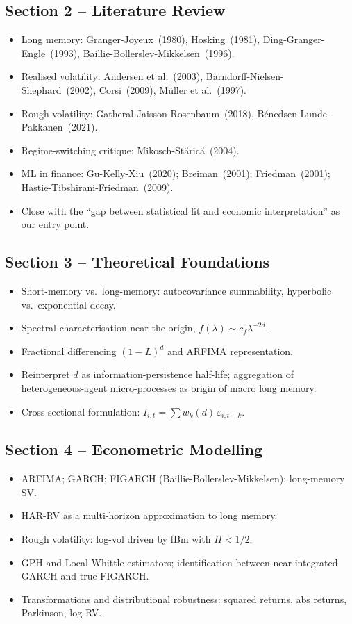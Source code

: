 \documentclass[11pt,a4paper]{article}
\begin{document}
\subsection{Section 2 -- Literature Review}
\begin{itemize}
  \item Long memory: Granger-Joyeux~(1980), Hosking~(1981),
  Ding-Granger-Engle~(1993), Baillie-Bollerslev-Mikkelsen~(1996).
  \item Realised volatility: Andersen et al.~(2003),
  Barndorff-Nielsen-Shephard~(2002), Corsi~(2009), M\"uller et al.~(1997).
  \item Rough volatility: Gatheral-Jaisson-Rosenbaum~(2018),
  B\'enedsen-Lunde-Pakkanen~(2021).
  \item Regime-switching critique: Mikosch-St\u aric\u a~(2004).
  \item ML in finance: Gu-Kelly-Xiu~(2020); Breiman~(2001);
  Friedman~(2001); Hastie-Tibshirani-Friedman~(2009).
  \item Close with the ``gap between statistical fit and economic
  interpretation'' as our entry point.
\end{itemize}

\subsection{Section 3 -- Theoretical Foundations}
\begin{itemize}
  \item Short-memory vs.\ long-memory: autocovariance summability,
  hyperbolic vs.\ exponential decay.
  \item Spectral characterisation near the origin,
  $f(\lambda)\sim c_f\lambda^{-2d}$.
  \item Fractional differencing $(1-L)^d$ and ARFIMA representation.
  \item Reinterpret $d$ as information-persistence half-life; aggregation
  of heterogeneous-agent micro-processes as origin of macro long memory.
  \item Cross-sectional formulation: $I_{i,t}=\sum w_k(d)\,\varepsilon_{i,t-k}$.
\end{itemize}

\subsection{Section 4 -- Econometric Modelling}
\begin{itemize}
  \item ARFIMA; GARCH; FIGARCH (Baillie-Bollerslev-Mikkelsen); long-memory SV.
  \item HAR-RV as a multi-horizon approximation to long memory.
  \item Rough volatility: log-vol driven by fBm with $H<1/2$.
  \item GPH and Local Whittle estimators; identification between
  near-integrated GARCH and true FIGARCH.
  \item Transformations and distributional robustness: squared returns,
  abs returns, Parkinson, log RV.
\end{itemize}
\end{document}
